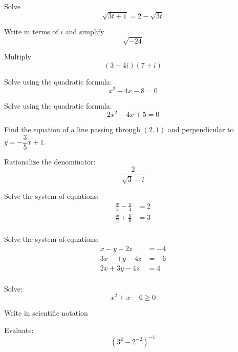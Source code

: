 \documentclass[fleqn,addpoints]{exam}
\begin{document}
\begin{questions}
\question
Solve
\[
  \sqrt{3t + 1} = 2 - \sqrt{3t}
\]
\vspace{1 cm}

\question
Write in terms of $i$ and simplify
\[
  \sqrt{-24}
\]
\vspace{1 cm}

\question
Multiply
\[
  (3 - 4i)(7 + i)
\]
\vspace{1 cm}

\question
Solve using the quadratic formula:
\[
  x^2 + 4x - 8 = 0
\]
\vspace{1 cm}

\question
Solve using the quadratic formula:
\[
  2x^2 - 4x + 5 = 0
\]
\vspace{1 cm}

\question
Find the equation of a line passing through $(2, 1)$ and perpendicular to $y = -\dfrac{3}{5}x + 1$.
\vspace{1 cm}

\question
Rationalize the denominator:
\[
  \frac{2}{\sqrt{3} - i}
\]
\vspace{1 cm}

\question
Solve the system of equations:
\begin{align*}
  \frac{x}{3} - \frac{y}{4} &= 2 \\
  \frac{x}{2} + \frac{y}{6} &= 3 \\
\end{align*}
\vspace{1 cm}

\question
Solve the system of equations:
\begin{align*}
  x - y + 2z   &= -4 \\
  3x -+ y - 4z &= -6 \\
  2x + 3y - 4z &= 4 \\
\end{align*}
\vspace{1 cm}

\question
Solve:
\[
  x^2 + x - 6 \geq 0
\]
\vspace{1 cm}

\question
Write in scientific notation
\vspace{1 cm}

\question
Evaluate:
\[
  (3^2 - 2^{-2})^{-1}
\]
\vspace{1 cm}

\end{questions}
\end{document}
